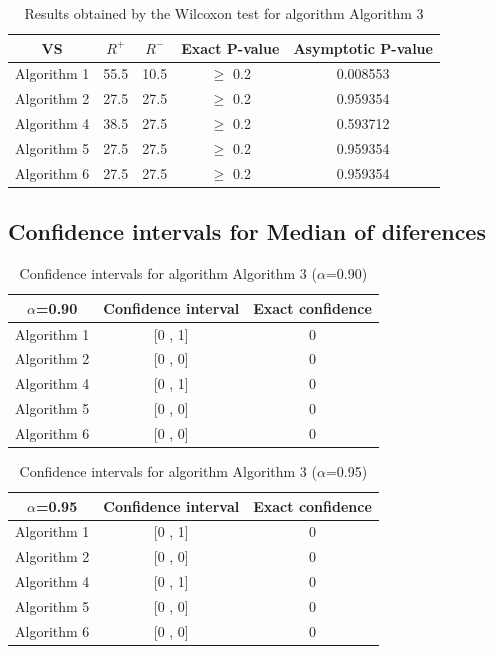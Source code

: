 \documentclass[a4paper,10pt]{article}
\begin{document}
\begin{table}[!htp]
\centering\small
\begin{tabular}{
|c|c|c|c|c|}
\hline
 VS & $R^{+}$ & $R^{-}$ & Exact P-value & Asymptotic P-value \\ \hline 
Algorithm 1 & 55.5 & 10.5 & $\geq$ 0.2 & 0.008553\\ \hline 
Algorithm 2 & 27.5 & 27.5 & $\geq$ 0.2 & 0.959354\\ \hline 
Algorithm 4 & 38.5 & 27.5 & $\geq$ 0.2 & 0.593712\\ \hline 
Algorithm 5 & 27.5 & 27.5 & $\geq$ 0.2 & 0.959354\\ \hline 
Algorithm 6 & 27.5 & 27.5 & $\geq$ 0.2 & 0.959354\\ \hline 

\end{tabular}
\caption{Results obtained by the Wilcoxon test for algorithm Algorithm 3}
\end{table}

\subsection{Confidence intervals for Median of diferences}

\begin{table}[!htp]
\centering\small
\begin{tabular}{
|c|c|c|}
\hline
 $\alpha$=0.90 & Confidence interval & Exact confidence \\ \hline 
Algorithm 1 & [0 , 1] & 0\\ \hline 
Algorithm 2 & [0 , 0] & 0\\ \hline 
Algorithm 4 & [0 , 1] & 0\\ \hline 
Algorithm 5 & [0 , 0] & 0\\ \hline 
Algorithm 6 & [0 , 0] & 0\\ \hline 

\end{tabular}
\caption{Confidence intervals for algorithm Algorithm 3 ($\alpha$=0.90)}
\end{table}
\begin{table}[!htp]
\centering\small
\begin{tabular}{
|c|c|c|}
\hline
 $\alpha$=0.95 & Confidence interval & Exact confidence \\ \hline 
Algorithm 1 & [0 , 1] & 0\\ \hline 
Algorithm 2 & [0 , 0] & 0\\ \hline 
Algorithm 4 & [0 , 1] & 0\\ \hline 
Algorithm 5 & [0 , 0] & 0\\ \hline 
Algorithm 6 & [0 , 0] & 0\\ \hline 

\end{tabular}
\caption{Confidence intervals for algorithm Algorithm 3 ($\alpha$=0.95)}
\end{table}
\end{document}
